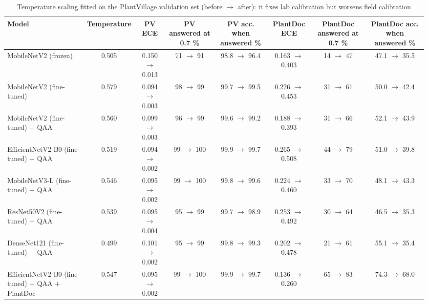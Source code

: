 \begin{table}[t]
\centering
\small
\caption{Temperature scaling fitted on the PlantVillage validation set (before $\rightarrow$ after): it fixes lab calibration but worsens field calibration}
\label{tab:table_calibration}
\begin{tabular}{lccccccc}
\toprule
Model & Temperature & PV ECE & PV answered at 0.7 \% & PV acc. when answered \% & PlantDoc ECE & PlantDoc answered at 0.7 \% & PlantDoc acc. when answered \% \\
\midrule
MobileNetV2 (frozen) & 0.505 & 0.150 $\rightarrow$ 0.013 & 71 $\rightarrow$ 91 & 98.8 $\rightarrow$ 96.4 & 0.163 $\rightarrow$ 0.403 & 14 $\rightarrow$ 47 & 47.1 $\rightarrow$ 35.5 \\
MobileNetV2 (fine-tuned) & 0.579 & 0.094 $\rightarrow$ 0.003 & 98 $\rightarrow$ 99 & 99.7 $\rightarrow$ 99.5 & 0.226 $\rightarrow$ 0.453 & 31 $\rightarrow$ 61 & 50.0 $\rightarrow$ 42.4 \\
MobileNetV2 (fine-tuned) + QAA & 0.560 & 0.099 $\rightarrow$ 0.003 & 96 $\rightarrow$ 99 & 99.6 $\rightarrow$ 99.2 & 0.188 $\rightarrow$ 0.393 & 31 $\rightarrow$ 66 & 52.1 $\rightarrow$ 43.9 \\
EfficientNetV2-B0 (fine-tuned) + QAA & 0.519 & 0.094 $\rightarrow$ 0.002 & 99 $\rightarrow$ 100 & 99.9 $\rightarrow$ 99.7 & 0.265 $\rightarrow$ 0.508 & 44 $\rightarrow$ 79 & 51.0 $\rightarrow$ 39.8 \\
MobileNetV3-L (fine-tuned) + QAA & 0.546 & 0.095 $\rightarrow$ 0.002 & 99 $\rightarrow$ 100 & 99.8 $\rightarrow$ 99.6 & 0.224 $\rightarrow$ 0.460 & 33 $\rightarrow$ 70 & 48.1 $\rightarrow$ 43.3 \\
ResNet50V2 (fine-tuned) + QAA & 0.539 & 0.095 $\rightarrow$ 0.004 & 95 $\rightarrow$ 99 & 99.7 $\rightarrow$ 98.9 & 0.253 $\rightarrow$ 0.492 & 30 $\rightarrow$ 64 & 46.5 $\rightarrow$ 35.3 \\
DenseNet121 (fine-tuned) + QAA & 0.499 & 0.101 $\rightarrow$ 0.002 & 95 $\rightarrow$ 99 & 99.8 $\rightarrow$ 99.3 & 0.202 $\rightarrow$ 0.478 & 21 $\rightarrow$ 61 & 55.1 $\rightarrow$ 35.4 \\
EfficientNetV2-B0 (fine-tuned) + QAA + PlantDoc & 0.547 & 0.095 $\rightarrow$ 0.002 & 99 $\rightarrow$ 100 & 99.9 $\rightarrow$ 99.7 & 0.136 $\rightarrow$ 0.260 & 65 $\rightarrow$ 83 & 74.3 $\rightarrow$ 68.0 \\
\bottomrule
\end{tabular}
\end{table}
